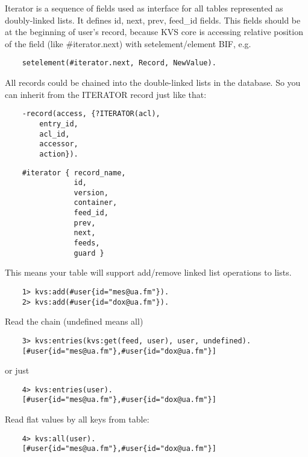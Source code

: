 Iterator is a sequence of fields used as interface for all tables
represented as doubly-linked lists. It defines id, next, prev,
feed\_id fields. This fields should be at the beginning of user's record,
because KVS core is accessing relative position of the
field (like \#iterator.next) with setelement/element BIF, e.g.

\begin{lstlisting}
    setelement(#iterator.next, Record, NewValue).
\end{lstlisting}

All records could be chained into the double-linked lists in the database.
So you can inherit from the ITERATOR record just like that:

\begin{lstlisting}
    -record(access, {?ITERATOR(acl),
        entry_id,
        acl_id,
        accessor,
        action}).
\end{lstlisting}

\begin{lstlisting}
    #iterator { record_name,
                id,
                version,
                container,
                feed_id,
                prev,
                next,
                feeds,
                guard }
\end{lstlisting}

This means your table will support add/remove linked list operations to lists.

\begin{lstlisting}
    1> kvs:add(#user{id="mes@ua.fm"}).
    2> kvs:add(#user{id="dox@ua.fm"}).
\end{lstlisting}

Read the chain (undefined means all)

\begin{lstlisting}
    3> kvs:entries(kvs:get(feed, user), user, undefined).
    [#user{id="mes@ua.fm"},#user{id="dox@ua.fm"}]
\end{lstlisting}

or just

\begin{lstlisting}
    4> kvs:entries(user).
    [#user{id="mes@ua.fm"},#user{id="dox@ua.fm"}]
\end{lstlisting}

Read flat values by all keys from table:

\begin{lstlisting}
    4> kvs:all(user).
    [#user{id="mes@ua.fm"},#user{id="dox@ua.fm"}]
\end{lstlisting}

